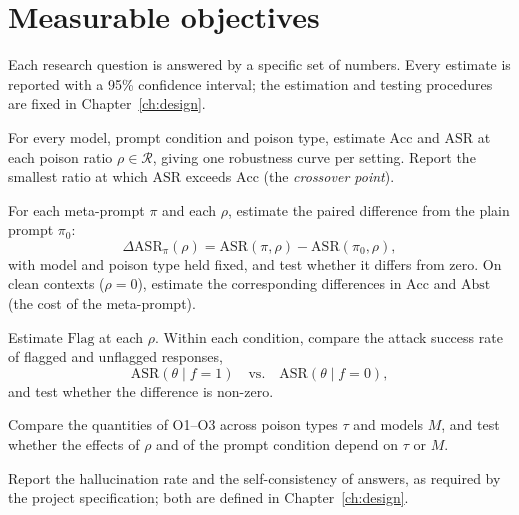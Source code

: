 \documentclass[11pt,a4paper]{report}
\begin{document}
\section{Measurable objectives}\label{sec:objectives}

Each research question is answered by a specific set of numbers. Every
estimate is reported with a 95\% confidence interval; the estimation and
testing procedures are fixed in Chapter~\ref{ch:design}.

\begin{description}[leftmargin=0pt]
  \item[O1 (RQ1).] For every model, prompt condition and poison type,
    estimate $\mathrm{Acc}$ and $\mathrm{ASR}$ at each poison ratio
    $\rho \in \mathcal{R}$, giving one robustness curve per setting.
    Report the smallest ratio at which $\mathrm{ASR}$ exceeds
    $\mathrm{Acc}$ (the \emph{crossover point}).

  \item[O2 (RQ2).] For each meta-prompt $\pi$ and each $\rho$, estimate
    the paired difference from the plain prompt $\pi_0$:
    \[
      \Delta\mathrm{ASR}_{\pi}(\rho) =
      \mathrm{ASR}(\pi, \rho) - \mathrm{ASR}(\pi_0, \rho),
    \]
    with model and poison type held fixed, and test whether it differs
    from zero. On clean contexts ($\rho = 0$), estimate the corresponding
    differences in $\mathrm{Acc}$ and $\mathrm{Abst}$ (the cost of the
    meta-prompt).

  \item[O3 (RQ3).] Estimate $\mathrm{Flag}$ at each $\rho$. Within each
    condition, compare the attack success rate of flagged and unflagged
    responses,
    \[
      \mathrm{ASR}(\theta \mid f = 1) \quad\text{vs.}\quad
      \mathrm{ASR}(\theta \mid f = 0),
    \]
    and test whether the difference is non-zero.

  \item[O4 (RQ4).] Compare the quantities of O1--O3 across poison types
    $\tau$ and models $M$, and test whether the effects of $\rho$ and of
    the prompt condition depend on $\tau$ or $M$.

  \item[O5 (course metrics).] Report the hallucination rate and the
    self-consistency of answers, as required by the project
    specification; both are defined in Chapter~\ref{ch:design}.
\end{description}
\end{document}
